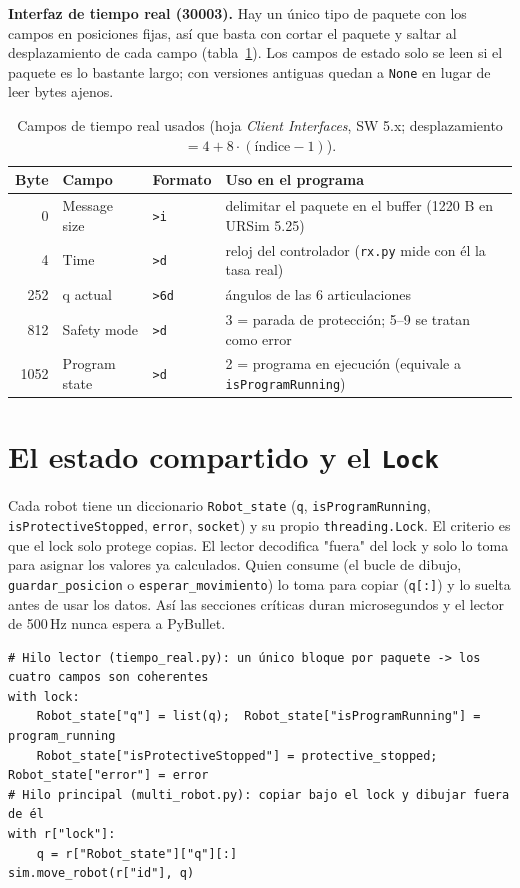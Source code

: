 \documentclass[10pt,a4paper]{article}
\newcommand{\code}[1]{\texttt{\small #1}}
\begin{document}
\textbf{Interfaz de tiempo real (30003).} Hay un único tipo de paquete con los campos en posiciones fijas, así que basta con cortar el paquete y saltar al desplazamiento de cada campo (tabla~\ref{tab:rt}). Los campos de estado solo se leen si el paquete es lo bastante largo; con versiones antiguas quedan a \code{None} en lugar de leer bytes ajenos.

\begin{table}[h]
\centering\small
\caption{Campos de tiempo real usados (hoja \emph{Client Interfaces}, SW 5.x; desplazamiento $=4+8\cdot(\text{índice}-1)$).}\label{tab:rt}
\begin{tabular}{@{}r l l l@{}}
\toprule
Byte & Campo & Formato & Uso en el programa \\ \midrule
0 & Message size & \code{>i} & delimitar el paquete en el buffer (1220 B en URSim 5.25)\\
4 & Time & \code{>d} & reloj del controlador (\code{rx.py} mide con él la tasa real)\\
252 & q actual & \code{>6d} & ángulos de las 6 articulaciones\\
812 & Safety mode & \code{>d} & 3 = parada de protección; 5--9 se tratan como error\\
1052 & Program state & \code{>d} & 2 = programa en ejecución (equivale a \code{isProgramRunning})\\ \bottomrule
\end{tabular}
\end{table}

\section{El estado compartido y el \texttt{Lock}}

Cada robot tiene un diccionario \code{Robot\_state} (\code{q}, \code{isProgramRunning}, \code{isProtectiveStopped}, \code{error}, \code{socket}) y su propio \code{threading.Lock}. El criterio es que el lock solo protege copias. El lector decodifica "fuera" del lock y solo lo toma para asignar los valores ya calculados. Quien consume (el bucle de dibujo, \code{guardar\_posicion} o \code{esperar\_movimiento}) lo toma para copiar (\code{q[:]}) y lo suelta antes de usar los datos. Así las secciones críticas duran microsegundos y el lector de 500\,Hz nunca espera a PyBullet.

\begin{lstlisting}[numbers=none]
# Hilo lector (tiempo_real.py): un único bloque por paquete -> los cuatro campos son coherentes
with lock:
    Robot_state["q"] = list(q);  Robot_state["isProgramRunning"] = program_running
    Robot_state["isProtectiveStopped"] = protective_stopped;  Robot_state["error"] = error
# Hilo principal (multi_robot.py): copiar bajo el lock y dibujar fuera de él
with r["lock"]:
    q = r["Robot_state"]["q"][:]
sim.move_robot(r["id"], q)
\end{lstlisting}
\end{document}
